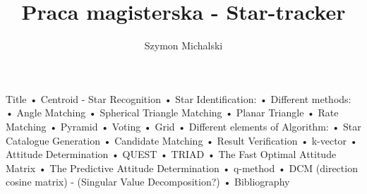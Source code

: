 \documentclass[12pt,a4paper,oneside]{article}
\author{Szymon Michalski}
\title{Praca magisterska - Star-tracker}
\begin{document}
Title
\newline
• Centroid - Star Recognition
\newline
• Star Identification:
\newline
• Different methods:
\newline
• Angle Matching
\newline
• Spherical Triangle Matching
\newline
• Planar Triangle
\newline
• Rate Matching
\newline
• Pyramid
\newline
• Voting
\newline
• Grid
\newline
• Different elements of Algorithm:
\newline
• Star Catalogue Generation
\newline
• Candidate Matching
\newline
• Result Verification
\newline
• k-vector
\newline
• Attitude Determination
\newline
• QUEST
\newline
• TRIAD
\newline
• The Fast Optimal Attitude Matrix
\newline
• The Predictive Attitude Determination
\newline
• q-method
\newline
• DCM (direction cosine matrix) - (Singular Value Decomposition?)
\newline
• Bibliography
\end{document}
